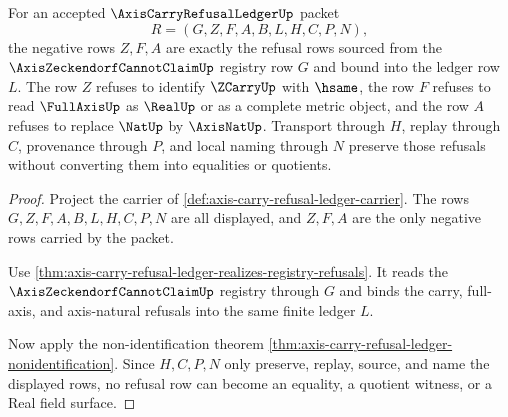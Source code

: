 \begin{theorem}
\label{thm:axis-carry-refusal-ledger-negative-row-exactness}
For an accepted $\AxisCarryRefusalLedgerUp$ packet
$$
R=(G,Z,F,A,B,L,H,C,P,N),
$$
the negative rows $Z,F,A$ are exactly the refusal rows sourced from the $\AxisZeckendorfCannotClaimUp$ registry row $G$ and bound into the ledger row $L$. The row $Z$ refuses to identify $\ZCarryUp$ with $\hsame$, the row $F$ refuses to read $\FullAxisUp$ as $\RealUp$ or as a complete metric object, and the row $A$ refuses to replace $\NatUp$ by $\AxisNatUp$. Transport through $H$, replay through $C$, provenance through $P$, and local naming through $N$ preserve those refusals without converting them into equalities or quotients.
\end{theorem}
\begin{proof}
Project the carrier of \autoref{def:axis-carry-refusal-ledger-carrier}. The rows $G,Z,F,A,B,L,H,C,P,N$ are all displayed, and $Z,F,A$ are the only negative rows carried by the packet.

Use \autoref{thm:axis-carry-refusal-ledger-realizes-registry-refusals}. It reads the $\AxisZeckendorfCannotClaimUp$ registry through $G$ and binds the carry, full-axis, and axis-natural refusals into the same finite ledger $L$.

Now apply the non-identification theorem \autoref{thm:axis-carry-refusal-ledger-nonidentification}. Since $H,C,P,N$ only preserve, replay, source, and name the displayed rows, no refusal row can become an equality, a quotient witness, or a Real field surface.
\end{proof}

